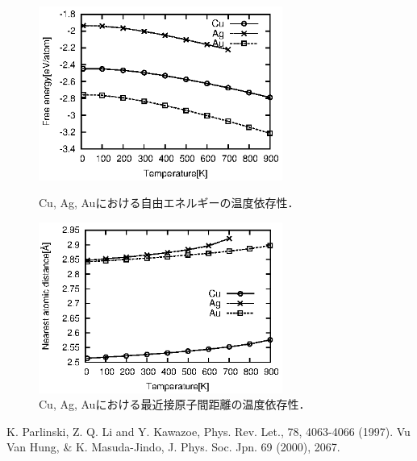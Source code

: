 \documentclass[12pt, a4paper]{jarticle}
\newcommand{\講演番号}
{}
\newcommand{\講演題目}
{非調和振動の効果を入れた有限温度自由エネルギー計算}
\newcommand{\英文題目}
{Free energy calculation of finite temperature with anharmonic effects.}
\newcommand{\和文所属}
{関西学院大・理工}
\newcommand{\和文氏名}
{榊原健，西谷滋人}
\newcommand{\英文所属}
{Department of Informatics, Kwansei Gakuin Univ}
\newcommand{\英文氏名}
{K. Sakakibara, and S. R. Nishitani}
\newlength\題目幅
\newlength\ヘッダ項目間隔
\newlength\所属インデント
\newlength\和文氏名インデント
\newlength\英文氏名インデント
\newlength\最小所属氏名間隔
\newlength\ヘッダ行間隔
\newlength\本文行間隔
\newlength\上端余白
\newlength\左端余白
\begin{document}
\begin{center}
\begin{figure}[b]
\begin{minipage}{0.5\hsize}
\begin{center}
\includegraphics[width=8cm]{./energy.eps}
\caption{\small{Cu, Ag, Auにおける自由エネルギーの温度依存性．}}
\end{center}
\end{minipage}
\hspace{5mm}
\begin{minipage}{0.5\hsize}
\begin{center}
\includegraphics[width=8cm]{./distance.eps}
\caption{\small{Cu, Ag, Auにおける最近接原子間距離の温度依存性．}}
\end{center}
\end{minipage}
\end{figure}
\end{center}

\smallskip
{\small\setlength\baselineskip{10pt}	%
\begin{thebibliography}{9}
K. Parlinski, Z. Q. Li and Y. Kawazoe, Phys. Rev. Let., 78, 4063-4066 (1997).
Vu Van Hung, \& K. Masuda-Jindo, J. Phys. Soc. Jpn. 69 (2000), 2067.
\end{thebibliography}
}
\end{document}
